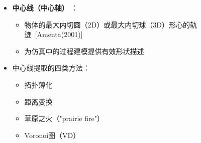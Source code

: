 
\begin{frame}
\begin{itemize}
\item \textbf{中心线（中心轴）} ： 
\begin{itemize}
\item 物体的最大内切圆（2D）或最大内切球（3D）形心的轨迹~[Amenta(2001)]
\item 为仿真中的过程建模提供有效形状描述
\end{itemize}
 \item 中心线提取的四类方法：
\begin{itemize}
 \item 拓扑薄化
 \item 距离变换
 \item 草原之火（"prairie fire"）
 \item \alert{Voronoi图（VD）}
\end{itemize}
\end{itemize}
\end{frame}

